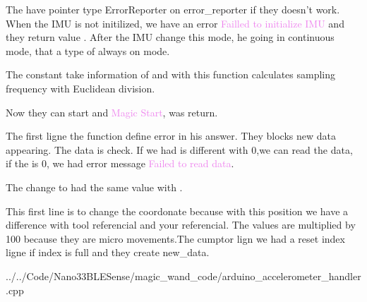 The  have pointer type ErrorReporter on error\_reporter if they doesn't work. When the IMU is not initilized, we have an error \textcolor{violet}{Failled to initialize IMU} and they return value . 
After the IMU change this mode, he going in continuous mode, that a type of always on mode.  

The constant  take information of   and with  this function calculates sampling frequency with Euclidean division.

Now they can start and \textcolor{violet}{Magic Start},  was return. 

\begin{center}
    		
    \label{Code: Magic Wand Arduino Read Accelerometer}
\end{center}


The first ligne the function  define error in his answer. They blocks new data appearing.  The  data is check. If we had  is different with 0,we can read the data, if the  is 0, we had error message \textcolor{violet}{Failed to read data}. 

The  change to had the same value with . 

\begin{center}
    		
    \label{Magic Wand Arduino Accelerometer handler read data}
\end{center}

This first line is to change the coordonate because with this position we have a difference with tool referencial and your referencial. The values are multiplied by 100 because they are micro movements.The cumptor lign we had a reset index ligne if index is full and they create new\_data. 

\begin{center}
    		 {../../Code/Nano33BLESense/magic_wand_code/arduino_accelerometer_handler.cpp}
    \label{Magic Wand Arduino Accelerometer handler read data}
\end{center}


